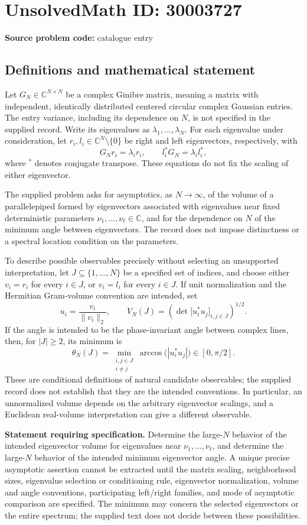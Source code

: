 \documentclass[11pt]{article}
\newcommand{\C}{\mathbb{C}}
\begin{document}
\section*{UnsolvedMath ID: 30003727}
\textbf{Source problem code:} catalogue entry
\subsection{Definitions and mathematical statement}
Let \(G_N\in\C^{N\times N}\) be a complex Ginibre matrix, meaning a matrix with independent, identically distributed centered circular complex Gaussian entries. The entry variance, including its dependence on \(N\), is not specified in the supplied record. Write its eigenvalues as \(\lambda_1,\ldots,\lambda_N\). For each eigenvalue under consideration, let \(r_i,l_i\in\C^N\setminus\{0\}\) be right and left eigenvectors, respectively, with
\[
G_Nr_i=\lambda_i r_i,
\qquad l_i^*G_N=\lambda_i l_i^*,
\]
where \({}^*\) denotes conjugate transpose. These equations do not fix the scaling of either eigenvector.

The supplied problem asks for asymptotics, as \(N\to\infty\), of the volume of a parallelepiped formed by eigenvectors associated with eigenvalues near fixed deterministic parameters \(\nu_1,\ldots,\nu_\ell\in\C\), and for the dependence on \(N\) of the minimum angle between eigenvectors. The record does not impose distinctness or a spectral location condition on the parameters.

To describe possible observables precisely without selecting an unsupported interpretation, let \(J\subseteq\{1,\ldots,N\}\) be a specified set of indices, and choose either \(v_i=r_i\) for every \(i\in J\), or \(v_i=l_i\) for every \(i\in J\). If unit normalization and the Hermitian Gram-volume convention are intended, set
\[
 u_i=\frac{v_i}{\|v_i\|_2},\qquad
 V_N(J)=\left(\det\bigl[u_i^*u_j\bigr]_{i,j\in J}\right)^{1/2}.
\]
If the angle is intended to be the phase-invariant angle between complex lines, then, for \(|J|\geq2\), its minimum is
\[
 \theta_N(J)=\min_{\substack{i,j\in J\\i\ne j}}
 \arccos\bigl(|u_i^*u_j|\bigr)\in[0,\pi/2].
\]
These are conditional definitions of natural candidate observables; the supplied record does not establish that they are the intended conventions. In particular, an unnormalized volume depends on the arbitrary eigenvector scalings, and a Euclidean real-volume interpretation can give a different observable.

\textbf{Statement requiring specification.} Determine the large-\(N\) behavior of the intended eigenvector volume for eigenvalues near \(\nu_1,\ldots,\nu_\ell\), and determine the large-\(N\) behavior of the intended minimum eigenvector angle. A unique precise asymptotic assertion cannot be extracted until the matrix scaling, neighborhood sizes, eigenvalue selection or conditioning rule, eigenvector normalization, volume and angle conventions, participating left/right families, and mode of asymptotic comparison are specified. The minimum may concern the selected eigenvectors or the entire spectrum; the supplied text does not decide between these possibilities.
\end{document}
